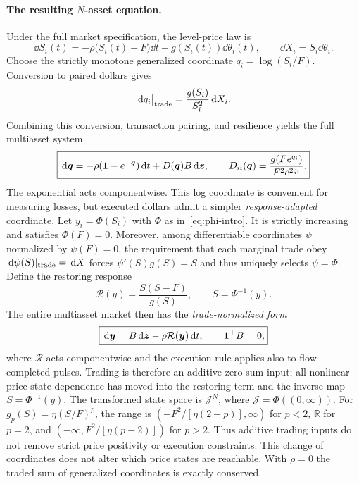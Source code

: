 \documentclass[review,hidelinks,onefignum,onetabnum]{siamonline250211}
\begin{document}
\paragraph{The resulting $N$-asset equation.} Under the full market specification, the level-price law is
\begin{equation}\label{eq:level-dynamics}
\boxed{\dd S_i(t)=-\rho\big(S_i(t)-F\big)\dd t+g(S_i(t))\dd\theta_i(t),\qquad \dd X_i=S_i\dd\theta_i.}
\end{equation}
Choose the strictly monotone generalized coordinate $q_i=\log(S_i/F)$. Conversion to paired dollars gives
\begin{equation}\label{eq:log-impact}
\,\mathrm{d} q_i\big|_{\rm trade}=\frac{g(S_i)}{S_i^2}\,\mathrm{d} X_i.
\end{equation}
Combining this conversion, transaction pairing, and resilience yields the full multiasset system
\begin{equation}\label{eq:master}
\boxed{\,\mathrm{d}\bm q=-\rho(\mathbf{1}-e^{-\bm q})\,\mathrm{d} t+D(\bm q)B\,\mathrm{d}\bm z,\qquad
D_{ii}(\bm q)=\frac{g(Fe^{q_i})}{F^2e^{2q_i}}.}
\end{equation}
The exponential acts componentwise. This log coordinate is convenient for measuring losses, but executed dollars admit a simpler \emph{response-adapted} coordinate. Let $y_i=\Phi(S_i)$ with $\Phi$ as in~\eqref{eq:phi-intro}. It is strictly increasing and satisfies $\Phi(F)=0$. Moreover, among differentiable coordinates $\psi$ normalized by $\psi(F)=0$, the requirement that each marginal trade obey $\,\mathrm{d}\psi(S)|_{\rm trade}=\,\mathrm{d} X$ forces $\psi'(S)g(S)=S$ and thus uniquely selects $\psi=\Phi$. Define the restoring response
\[
\mathcal R(y)=\frac{S(S-F)}{g(S)},\qquad S=\Phi^{-1}(y).
\]
The entire multiasset market then has the \emph{trade-normalized form}
\begin{equation}\label{eq:normal-form}
\boxed{\,\mathrm{d}\bm y=B\,\mathrm{d}\bm z-\rho\mathcal R(\bm y)\,\mathrm{d} t,\qquad\mathbf{1}^\top B=0,}
\end{equation}
where $\mathcal R$ acts componentwise and the execution rule applies also to flow-completed pulses. Trading is therefore an additive zero-sum input; all nonlinear price-state dependence has moved into the restoring term and the inverse map $S=\Phi^{-1}(y)$. The transformed state space is $\mathcal J^N$, where $\mathcal J=\Phi((0,\infty))$. For $g_p(S)=\eta(S/F)^p$, the range is $(-F^2/[\eta(2-p)],\infty)$ for $p<2$, $\mathbb R$ for $p=2$, and $(-\infty,F^2/[\eta(p-2)])$ for $p>2$. Thus additive trading inputs do not remove strict price positivity or execution constraints. This change of coordinates does not alter which price states are reachable. With $\rho=0$ the traded sum of generalized coordinates is exactly conserved.
\end{document}
